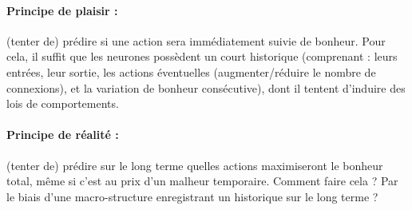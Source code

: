 \documentclass[a4paper,10pt]{article}
\theoremstyle{definition}
\theoremstyle{remark}
\theoremstyle{plain}
\begin{document}
\paragraph{Principe de plaisir :} (tenter de) prédire si une action sera immédiatement suivie de bonheur. Pour cela, il suffit que les neurones possèdent un court historique (comprenant : leurs entrées, leur sortie, les actions éventuelles (augmenter/réduire le nombre de connexions), et la variation de bonheur consécutive), dont il tentent d'induire des lois de comportements.

\paragraph{Principe de réalité :} (tenter de) prédire sur le long terme quelles actions maximiseront le bonheur total, même si c'est au prix d'un malheur temporaire. Comment faire cela ? Par le biais d'une macro-structure enregistrant un historique sur le long terme ?
\end{document}
